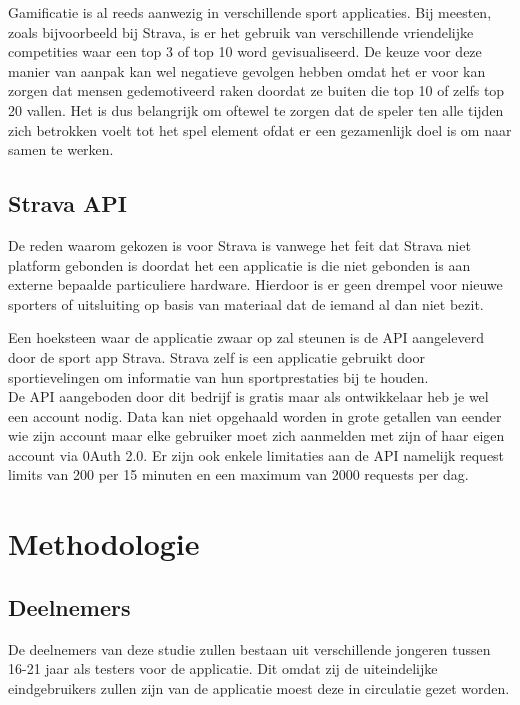 Gamificatie is al reeds aanwezig in verschillende sport applicaties. Bij meesten, zoals bijvoorbeeld bij Strava, is er het gebruik van verschillende vriendelijke competities waar een top 3 of top 10 word gevisualiseerd. De keuze voor deze manier van aanpak kan wel negatieve gevolgen hebben omdat het er voor kan zorgen dat mensen gedemotiveerd raken doordat ze buiten die top 10 of zelfs top 20 vallen. \autocite{Alen2020} Het is dus belangrijk om oftewel te zorgen dat de speler ten alle tijden zich betrokken voelt tot het spel element ofdat er een gezamenlijk doel is om naar samen te werken.

\subsection{Strava API}

De reden waarom gekozen is voor Strava is vanwege het feit dat Strava niet platform gebonden is doordat het een applicatie is die niet gebonden is aan externe bepaalde particuliere hardware. \autocite{David2023} Hierdoor is er geen drempel voor nieuwe sporters of uitsluiting op basis van materiaal dat de iemand al dan niet bezit. 

Een hoeksteen waar de applicatie zwaar op zal steunen is de API aangeleverd door de sport app Strava. Strava zelf is een applicatie gebruikt door sportievelingen om informatie van hun sportprestaties bij te houden. \\

De API aangeboden door dit bedrijf is gratis maar als ontwikkelaar heb je wel een account nodig. Data kan niet opgehaald worden in grote getallen van eender wie zijn account maar elke gebruiker moet zich aanmelden met zijn of haar eigen account via 0Auth 2.0. Er zijn ook enkele limitaties aan de API namelijk request limits van 200 per 15 minuten en een maximum van 2000 requests per dag. \autocite{Strava2023}

\section{Methodologie}%
\label{sec:methodologie}

\subsection{Deelnemers}

De deelnemers van deze studie zullen bestaan uit verschillende jongeren tussen 16-21 jaar als testers voor de applicatie. Dit omdat zij de uiteindelijke eindgebruikers zullen zijn van de applicatie moest deze in circulatie gezet worden.

